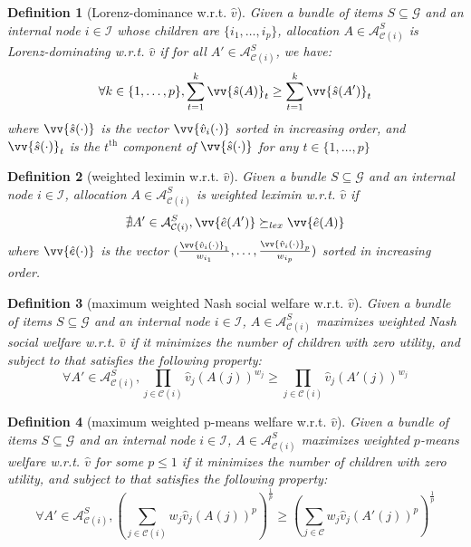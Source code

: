 \documentclass[]{article}
\newtheorem{definition}{Definition}
\newcommand{\items}{\mathcal{G}}
\newcommand{\children}{\mathcal{C}}
\newcommand{\internal}{\mathcal{I}}
\newcommand{\allocations}{\mathcal{A}}
\begin{document}
\begin{definition}[Lorenz-dominance w.r.t. $\hat{v}$] Given a bundle of items $S \subseteq \items$ and an internal node $i \in \internal$ whose children are $\{i_1, \ldots, i_p\}$, allocation $A \in \allocations^S_{\children(i)}$ is \emph{Lorenz-dominating w.r.t. $\hat{v}$} if for all $A' \in \allocations^S_{\children(i)}$, we have:
$$
\forall k \in \{1,\ldots, p\}, \sum_{t=1}^k \vv{\hat{s}(A)}_t \geq \sum_{t=1}^k \vv{\hat{s}(A')}_t
$$
where $\vv{\hat{s}(\cdot)}$ is the vector $\vv{\hat{v}_i(\cdot)}$ sorted in increasing order, and $\vv{\hat{s}(\cdot)}_t$ is the $t^{\text{th}}$ component of $\vv{\hat{s}(\cdot)}$ for any $t \in \{1, \ldots, p\}$ 
\end{definition}

\begin{definition}[weighted leximin w.r.t. $\hat{v}$] Given a bundle $S \subseteq \items$ and an internal node $i \in \internal$, allocation $A \in \allocations^S_{\children(i)}$ is \emph{weighted leximin w.r.t. $\hat{v}$} if 
$$
\nexists A' \in \allocations^S_{\children(i)}, \vv{\hat{e}(A')} \succeq_{lex} \vv{\hat{e}(A)}
$$
where $\vv{\hat{e}(\cdot)}$ is the vector $(\frac{\vv{\hat{v}_i(\cdot)}_1}{w_{i_1}}, \ldots, \frac{\vv{\hat{v}_i(\cdot)}_p}{w_{i_p}})$ sorted in increasing order.
\end{definition}

\begin{definition}[maximum weighted Nash social welfare w.r.t. $\hat{v}$] Given a bundle of items $S \subseteq \items$ and an internal node $i \in \internal$, $A \in \allocations^S_{\children(i)}$ \emph{maximizes weighted Nash social welfare w.r.t. $\hat{v}$} if it minimizes the number of children with zero utility, and subject to that satisfies the following property:
$$
\forall A' \in \allocations^S_{\children(i)},
\prod_{j \in \children(i)} \hat{v}_{j}(A(j))^{w_{j}} \geq \prod_{j \in \children(i)} \hat{v}_{j}(A'(j))^{w_{j}}
$$
\end{definition}

\begin{definition}[maximum weighted p-means welfare w.r.t. $\hat{v}$] Given a bundle of items $S \subseteq \items$ and an internal node $i \in \internal$, $A \in \allocations^S_{\children(i)}$ \emph{maximizes weighted $p$-means welfare w.r.t. $\hat{v}$} for some $p \leq 1$ if it minimizes the number of children with zero utility, and subject to that satisfies the following property:
$$
\forall A' \in \allocations^S_{\children(i)},
(\sum_{j \in \children(i)} w_{j} \hat{v}_{j}(A(j))^p)^{\frac{1}{p}} \geq (\sum_{j  \in \children} w_{j} \hat{v}_{j}(A'(j))^p )^{\frac{1}{p}}
$$

\end{definition}
\end{document}
